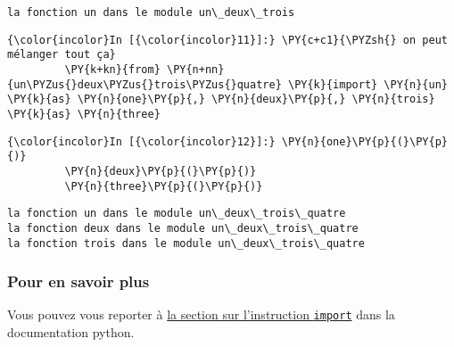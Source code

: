     \begin{Verbatim}[commandchars=\\\{\}]
la fonction un dans le module un\_deux\_trois

    \end{Verbatim}

    \begin{Verbatim}[commandchars=\\\{\}]
{\color{incolor}In [{\color{incolor}11}]:} \PY{c+c1}{\PYZsh{} on peut mélanger tout ça}
         \PY{k+kn}{from} \PY{n+nn}{un\PYZus{}deux\PYZus{}trois\PYZus{}quatre} \PY{k}{import} \PY{n}{un} \PY{k}{as} \PY{n}{one}\PY{p}{,} \PY{n}{deux}\PY{p}{,} \PY{n}{trois} \PY{k}{as} \PY{n}{three}
\end{Verbatim}


    \begin{Verbatim}[commandchars=\\\{\}]
{\color{incolor}In [{\color{incolor}12}]:} \PY{n}{one}\PY{p}{(}\PY{p}{)}
         \PY{n}{deux}\PY{p}{(}\PY{p}{)}
         \PY{n}{three}\PY{p}{(}\PY{p}{)}
\end{Verbatim}


    \begin{Verbatim}[commandchars=\\\{\}]
la fonction un dans le module un\_deux\_trois\_quatre
la fonction deux dans le module un\_deux\_trois\_quatre
la fonction trois dans le module un\_deux\_trois\_quatre

    \end{Verbatim}

    \hypertarget{pour-en-savoir-plus}{%
\subsubsection{Pour en savoir plus}\label{pour-en-savoir-plus}}

    Vous pouvez vous reporter à
\href{https://docs.python.org/3/reference/simple_stmts.html\#the-import-statement}{la
section sur l'instruction \texttt{import}} dans la documentation python.